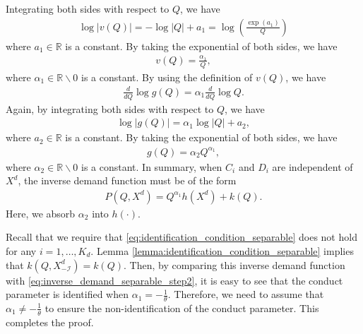 \documentclass[11pt, a4paper]{article}
\theoremstyle{remark}
\begin{document}
Integrating both sides with respect to $Q$, we have
\begin{align}
    \log |v(Q)| = -\log |Q| + a_1 = \log \left(\frac{\exp(a_1)}{Q}\right)
\end{align}
where $a_1 \in \mathbb{R}$ is a constant.
By taking the exponential of both sides, we have
\begin{align}
    v(Q) = \frac{\alpha_1}{Q}, 
\end{align}
where $\alpha_1 \in \mathbb{R}\backslash 0$ is a constant.
By using the definition of $v(Q)$, we have
\begin{align}
    \frac{d }{d Q}\log g(Q) = \alpha_1\frac{d}{dQ}\log Q.
\end{align}
Again, by integrating both sides with respect to $Q$, we have
\begin{align}
    \log |g(Q)| = \alpha_1\log |Q| + a_2,
\end{align}
where $a_2 \in \mathbb{R}$ is a constant.
By taking the exponential of both sides, we have
\begin{align}
    g(Q) = \alpha_2Q^{\alpha_1},
\end{align}
where $\alpha_2 \in \mathbb{R}\backslash 0$ is a constant.
In summary, when $C_i$ and $D_i$ are independent of $X^{d}$, the inverse demand function must be of the form
\begin{align}
    P(Q, X^{d}) = Q^{\alpha_1}h(X^{d}) + k(Q). \label{eq:inverse_demand_separable_step2}
\end{align}
Here, we absorb $\alpha_2$ into $h(\cdot)$.



Recall that we require that \eqref{eq:identification_condition_separable} does not hold for any $i = 1, \ldots, K_d$.
Lemma \ref{lemma:identification_condition_separable} implies that $k(Q, X^{d}_{-\mathcal{I}}) = k(Q)$.
Then, by comparing this inverse demand function with \eqref{eq:inverse_demand_separable_step2}, it is easy to see that the conduct parameter is identified when $\alpha_1 = -\frac{1}{\theta}$.
Therefore, we need to assume that $\alpha_1 \ne -\frac{1}{\theta}$ to ensure the non-identification of the conduct parameter.
This completes the proof.
\end{document}
